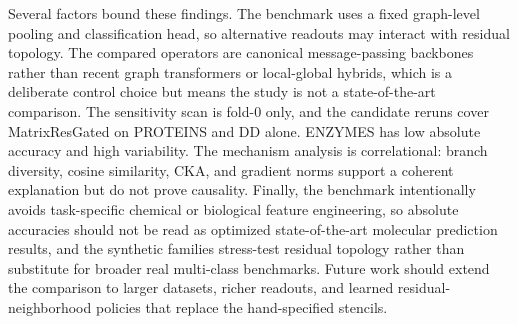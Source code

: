 Several factors bound these findings. The benchmark uses a fixed graph-level
pooling and classification head, so alternative readouts may interact with
residual topology. The compared operators are canonical message-passing
backbones rather than recent graph transformers or local-global hybrids, which
is a deliberate control choice but means the study is not a state-of-the-art
comparison. The sensitivity scan is fold-0 only, and the candidate reruns cover
MatrixResGated on PROTEINS and DD alone. ENZYMES has low absolute accuracy and
high variability. The mechanism analysis is correlational: branch diversity,
cosine similarity, CKA, and gradient norms support a coherent explanation but do
not prove causality. Finally, the benchmark intentionally avoids task-specific
chemical or biological feature engineering, so absolute accuracies should not be
read as optimized state-of-the-art molecular prediction results, and the
synthetic families stress-test residual topology rather than substitute for
broader real multi-class benchmarks. Future work should extend the comparison to
larger datasets, richer readouts, and learned residual-neighborhood policies
that replace the hand-specified stencils.
